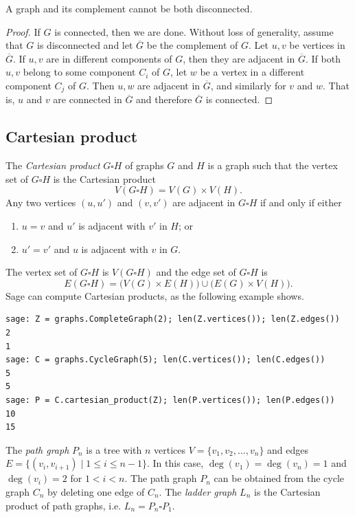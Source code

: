\begin{theorem}
A graph and its complement cannot be both disconnected.
\end{theorem}

\begin{proof}
If $G$ is connected, then we are done. Without loss of generality,
assume that $G$ is disconnected and let $\overline{G}$ be the
complement of $G$. Let $u,v$ be vertices in $\overline{G}$. If $u,v$
are in different components of $G$, then they are adjacent in
$\overline{G}$. If both $u,v$ belong to some component $C_i$ of $G$,
let $w$ be a vertex in a different component $C_j$ of $G$. Then $u,w$
are adjacent in $\overline{G}$, and similarly for $v$ and $w$. That is,
$u$ and $v$ are connected in $\overline{G}$ and therefore $\overline{G}$
is connected.
\end{proof}



\subsection{Cartesian product}

The \emph{Cartesian product}
$G \square H$\index{$\square$} of graphs $G$ and $H$ is a graph such
that the vertex set of $G \square H$ is the Cartesian product
\[
V(G \square H) = V(G) \times V(H).
\]
Any two vertices $(u, u')$ and $(v, v')$
are adjacent in $G \square H$ if and only if either
\begin{enumerate}
\item $u = v$ and $u'$ is adjacent with $v'$ in $H$; or

\item $u' = v'$ and $u$ is adjacent with $v$ in $G$.
\end{enumerate}
The vertex set of $G \square H$ is $V(G \square H)$
and the edge set of $G \square H$ is
\[
E(G \square H)
=
\big(V(G) \times E(H)\big) \cup \big(E(G) \times V(H)\big).
\]
Sage can compute Cartesian products, as the following example shows.
\begin{lstlisting}
sage: Z = graphs.CompleteGraph(2); len(Z.vertices()); len(Z.edges())
2
1
sage: C = graphs.CycleGraph(5); len(C.vertices()); len(C.edges())
5
5
sage: P = C.cartesian_product(Z); len(P.vertices()); len(P.edges())
10
15
\end{lstlisting}

The \emph{path graph} $P_n$ is a tree
with $n$ vertices $V = \{v_1, v_2, \dots, v_n\}$ and edges
$E = \{ (v_i, v_{i+1}) \;|\; 1 \leq i \leq n-1 \}$. In this case,
$\deg(v_1) = \deg(v_n) = 1$ and $\deg(v_i) = 2$ for $1 < i < n$. The
path graph $P_n$ can be obtained from the cycle graph $C_n$ by
deleting one edge of $C_n$. The
\emph{ladder graph} $L_n$ is the
Cartesian product of path graphs, i.e. $L_n = P_n \square P_1$.

